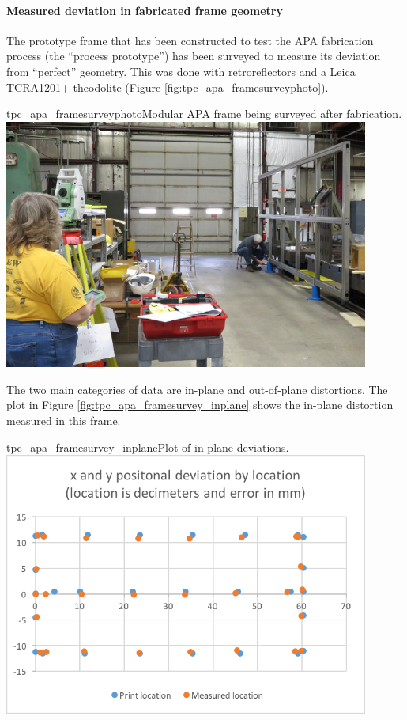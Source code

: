 \paragraph{Measured deviation in fabricated frame geometry}

The prototype frame that has been constructed to test the APA fabrication process (the ``process  prototype'') has been surveyed to measure its deviation from ``perfect'' geometry.  This was done with retroreflectors and a Leica TCRA1201+ theodolite (Figure \ref{fig:tpc_apa_framesurveyphoto}).

\begin{cdrfigure}{tpc_apa_framesurveyphoto}{Modular APA frame being surveyed after fabrication.}
\includegraphics[width=0.9\textwidth]{figures/tpc_apa_framesurveyphoto.png} 
\end{cdrfigure}

The two main categories of data are in-plane and out-of-plane distortions. The plot in Figure \ref{fig:tpc_apa_framesurvey_inplane} shows the in-plane distortion measured in this frame.

\begin{cdrfigure}{tpc_apa_framesurvey_inplane}{Plot of in-plane deviations.}
\includegraphics[width=0.9\textwidth]{figures/tpc_apa_framesurvey_inplane.png} 
\end{cdrfigure}

